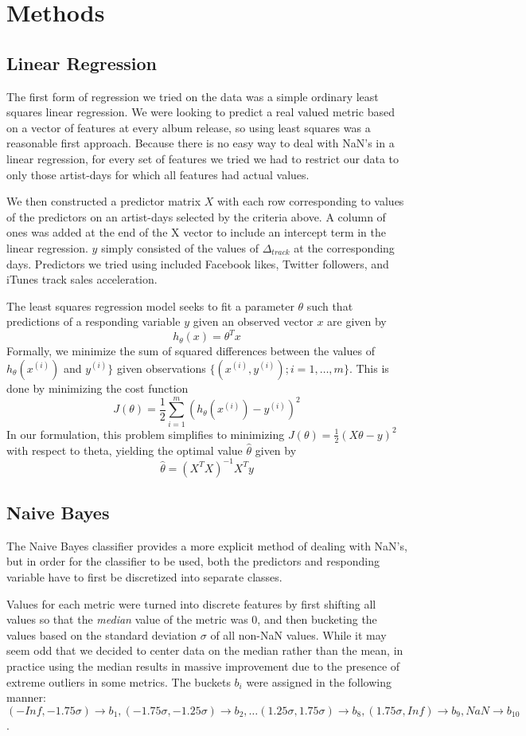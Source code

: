 \documentclass[conference]{IEEEtran}
\begin{document}
\section{Methods}
\subsection{Linear Regression}
The first form of regression we tried on the data was a simple ordinary least squares linear regression. We were looking to predict a real valued metric based on a vector of features at every album release, so using least squares was a reasonable first approach. Because there is no easy way to deal with NaN's in a linear regression, for every set of features we tried we had to restrict our data to only those artist-days for which all features had actual values.

We then constructed a predictor matrix $X$ with each row corresponding to values of the predictors on an artist-days selected by the criteria above. A column of ones was added at the end of the X vector to include an intercept term in the linear regression. $y$ simply consisted of the values of $\Delta_{track}$ at the corresponding days. Predictors we tried using included Facebook likes, Twitter followers, and iTunes track sales acceleration.

The least squares regression model seeks to fit a parameter $\theta$ such that predictions of a responding variable $y$ given an observed vector $x$ are given by
$$h_\theta(x) = \theta^T x$$
Formally, we minimize the sum of squared differences between the values of $h_\theta(x^{(i)})$ and $y^{(i)}\}$ given observations $\{(x^{(i)}, y^{(i)}); i = 1,\dots,m\}$. This is done by minimizing the cost function
$$J(\theta) = \frac{1}{2}\sum_{i=1}^{m}(h_\theta(x^{(i)}) - y^{(i)})^2$$
In our formulation, this problem simplifies to minimizing $J(\theta) = \frac{1}{2} (X\theta - y)^2$ with respect to theta, yielding the optimal value $\hat{\theta}$ given by
$$\hat{\theta} = (X^T X)^{-1} X^T y$$

\subsection{Naive Bayes}
The Naive Bayes classifier provides a more explicit method of dealing with NaN's, but in order for the classifier to be used, both the predictors and responding variable have to first be discretized into separate classes.

Values for each metric were turned into discrete features by first shifting all values so that the \textit{median} value of the metric was 0, and then bucketing the values based on the standard deviation $\sigma$ of all non-NaN values. While it may seem odd that we decided to center data on the median rather than the mean, in practice using the median results in massive improvement due to the presence of extreme outliers in some metrics. The buckets $b_i$ were assigned in the following manner: $(-Inf, -1.75\sigma)\rightarrow b_1, (-1.75\sigma, -1.25\sigma)\rightarrow b_2, \dots (1.25\sigma,1.75\sigma)\rightarrow b_8, (1.75\sigma,Inf)\rightarrow b_9, NaN\rightarrow b_{10}$.
\end{document}
